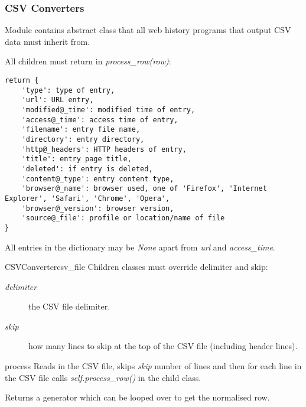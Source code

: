 \documentclass[letterpaper,10pt,english]{manual}
\begin{document}
\subsubsection{CSV Converters}

Module contains abstract class that all web history programs that output CSV data must inherit from.

All children must return in \emph{process\_row(row)}:

\begin{Verbatim}[commandchars=@\[\]]
return {
    'type': type of entry, 
    'url': URL entry, 
    'modified@_time': modified time of entry,
    'access@_time': access time of entry,
    'filename': entry file name, 
    'directory': entry directory,
    'http@_headers': HTTP headers of entry,
    'title': entry page title,
    'deleted': if entry is deleted,
    'content@_type': entry content type,
    'browser@_name': browser used, one of 'Firefox', 'Internet Explorer', 'Safari', 'Chrome', 'Opera',
    'browser@_version': browser version,
    'source@_file': profile or location/name of file
}
\end{Verbatim}

All entries in the dictionary may be \emph{None} apart from \emph{url} and \emph{access\_time}.

\hypertarget{webscavator.converters.csv_converter.CSVConverter}{}\begin{classdesc}{CSVConverter}{csv\_file}
Children classes must override delimiter and skip:
\begin{description}
\item[\emph{delimiter}]
the CSV file delimiter.

\item[\emph{skip}]
how many lines to skip at the top of the CSV file (including header lines).

\end{description}

\hypertarget{webscavator.converters.csv_converter.CSVConverter.process}{}\begin{methoddesc}{process}{}
Reads in the CSV file, skips \emph{skip} number of lines and then for each line in the CSV file calls
\emph{self.process\_row()} in the child class.

Returns a generator which can be looped over to get the normalised row.
\end{methoddesc}
\end{classdesc}
\hypertarget{module-webscavator.converters}{}
\modulesynopsis{}
\end{document}

